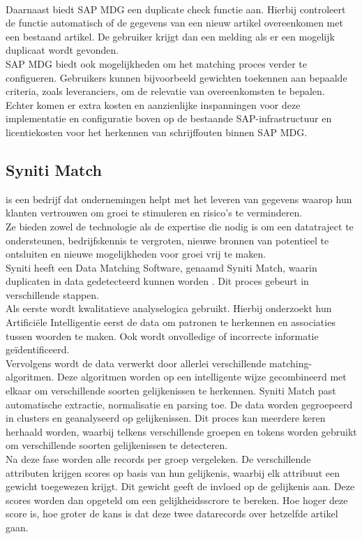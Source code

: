 \\Daarnaast biedt SAP MDG een duplicate check functie aan. Hierbij controleert de functie automatisch of de gegevens van een nieuw artikel overeenkomen met een bestaand artikel. De gebruiker krijgt dan een melding als er een mogelijk duplicaat wordt gevonden. 
\\ SAP MDG biedt ook mogelijkheden om het matching proces verder te configueren. Gebruikers kunnen bijvoorbeeld gewichten toekennen aan bepaalde criteria, zoals leveranciers, om de relevatie van overeenkomsten te bepalen.
\\Echter komen er extra kosten en aanzienlijke inspanningen voor deze implementatie en configuratie boven op de bestaande SAP-infrastructuur en licentiekosten voor het herkennen van schrijffouten binnen SAP MDG.

\subsection{Syniti Match}
\textcite{SynitiAbout} is een bedrijf dat ondernemingen helpt met het leveren van gegevens waarop hun klanten  vertrouwen om groei te stimuleren en risico's te verminderen.
\\Ze bieden zowel de technologie als de expertise die nodig is om een datatraject te ondersteunen, bedrijfskennis te vergroten, nieuwe bronnen van potentieel te ontsluiten en nieuwe mogelijkheden voor groei vrij te maken.
\\Syniti heeft een Data Matching Software, genaamd Syniti Match, waarin duplicaten in data gedetecteerd kunnen worden \autocite{SynitiMatch}. Dit proces gebeurt in verschillende stappen. 
\\Als eerste wordt kwalitatieve analyselogica gebruikt. Hierbij onderzoekt hun Artificiële Intelligentie eerst de data om patronen te herkennen en associaties tussen woorden te maken. Ook wordt onvolledige of incorrecte informatie geïdentificeerd. 
\\Vervolgens wordt de data verwerkt door allerlei verschillende matching-algoritmen. Deze algoritmen worden op een intelligente wijze gecombineerd met elkaar om verschillende soorten gelijkenissen te herkennen. Syniti Match past automatische extractie, normalisatie en parsing toe. De data worden gegroepeerd in clusters en geanalyseerd op gelijkenissen. Dit proces kan meerdere keren herhaald worden, waarbij telkens verschillende groepen en tokens worden gebruikt om verschillende soorten gelijkenissen te detecteren. 
\\Na deze fase worden alle records per groep vergeleken. De verschillende attributen krijgen scores op basis van hun gelijkenis, waarbij elk attribuut een gewicht toegewezen krijgt. Dit gewicht geeft de invloed op de gelijkenis aan. Deze scores worden dan opgeteld om een gelijkheidsscrore te bereken. Hoe hoger deze score is, hoe groter de kans is dat deze twee datarecords over hetzelfde artikel gaan. 
